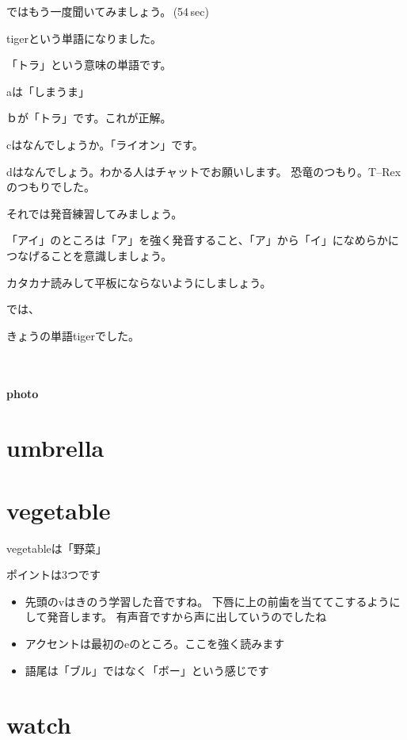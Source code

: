 \documentclass[12pt]{jlreq}
\begin{document}
ではもう一度聞いてみましょう。\faVolumeUp\,(54\,sec)

tigerという単語になりました。

「トラ」という意味の単語です。

aは「しまうま」

ｂが「トラ」です。これが正解。

cはなんでしょうか。「ライオン」です。

dはなんでしょう。わかる人はチャットでお願いします。
恐竜のつもり。T--Rexのつもりでした。


それでは発音練習してみましょう。

「アイ」のところは「ア」を強く発音すること、「ア」から「イ」になめらかにつなげることを意識しましょう。

カタカナ読みして平板にならないようにしましょう。

では、

きょうの単語tigerでした。

{\large \ComputerMouse}\,\,


\paragraph{photo}

\newpage
\section{umbrella}

\newpage
\section{vegetable}

vegetableは「野菜」

ポイントは3つです

\begin{itemize}
 \item 先頭のvはきのう学習した音ですね。
下唇に上の前歯を当ててこするようにして発音します。
有声音ですから声に出していうのでしたね
 \item アクセントは最初のeのところ。ここを強く読みます

 \item 語尾は「ブル」ではなく「ボー」という感じです
\end{itemize}


\newpage
\section{watch}
\end{document}
